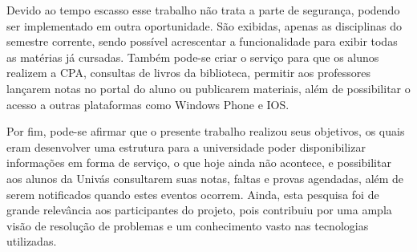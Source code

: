 	\par Devido ao tempo escasso esse trabalho não trata a parte de segurança,
podendo ser implementado em outra oportunidade. São exibidas, apenas as
disciplinas do semestre corrente, sendo possível acrescentar a funcionalidade
para exibir todas as matérias já cursadas. Também pode-se criar o serviço para
que os alunos realizem a CPA, consultas de livros da biblioteca, permitir aos
professores lançarem notas no portal do aluno ou publicarem materiais, além de
possibilitar o acesso a outras plataformas como Windows Phone e IOS.

	\par Por fim, pode-se afirmar que o presente trabalho realizou seus objetivos,
os quais eram desenvolver uma estrutura para a universidade poder
disponibilizar informações em forma de serviço, o que hoje ainda não acontece,
e possibilitar aos alunos da Univás consultarem suas notas, faltas e provas
agendadas, além de serem notificados quando estes eventos ocorrem. Ainda, esta
pesquisa foi de grande relevância aos participantes do projeto, pois contribuiu
por uma ampla visão de resolução de problemas e um conhecimento vasto nas
tecnologias utilizadas.

